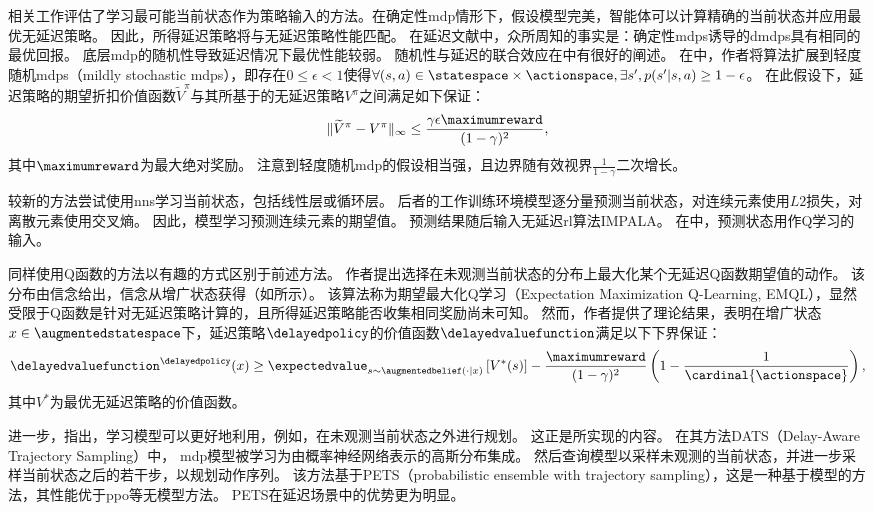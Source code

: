 相关工作评估了学习最可能当前状态\cite{walsh2009learning}作为策略输入的方法。在确定性\gls{mdp}情形下，假设模型完美，智能体可以计算精确的当前状态并应用最优无延迟策略。
因此，所得延迟策略将与无延迟策略性能匹配。
在延迟文献中，众所周知的事实是：确定性\glspl{mdp}诱导的\glspl{dmdp}具有相同的最优回报。
底层\gls{mdp}的随机性导致延迟情况下最优性能较弱。
随机性与延迟的联合效应在\cite[Remark 3.1]{derman2021acting}中有很好的阐述。
在\cite{walsh2009learning}中，作者将算法扩展到轻度随机\glspl{mdp}（mildly stochastic \glspl{mdp}），即存在$0\le\epsilon<1$使得$\forall (s,a)\in\statespace\times\actionspace, \exists s', p(s'\vert s,a)\geq 1-\epsilon$。
在此假设下，延迟策略的期望折扣价值函数$\widetilde{V}^{\pi}$与其所基于的无延迟策略$V^{\pi}$之间满足如下保证：
\begin{align*}
    \lVert \widetilde{V}^{\pi}-V^{\pi}\rVert_{\infty}\leq \frac{\gamma\epsilon \maximumreward}{(1-\gamma)^2},
\end{align*}
其中$\maximumreward$为最大绝对奖励。
注意到轻度随机\gls{mdp}的假设相当强，且边界随有效视界$\textstyle\frac{1}{1-\gamma}$二次增长。

较新的方法尝试使用\glspl{nn}学习当前状态，包括线性层\cite{derman2021acting}或循环层\cite{firoiu2018human}。
后者的工作训练环境模型逐分量预测当前状态，对连续元素使用$L2$损失，对离散元素使用交叉熵。
因此，模型学习预测连续元素的期望值。
预测结果随后输入无延迟\gls{rl}算法IMPALA\cite{espeholt2018impala}。
在\cite{derman2021acting}中，预测状态用作Q学习\cite{watkins1989learning}的输入。

同样使用Q函数的\cite{agarwal2021blind}方法以有趣的方式区别于前述方法。
作者提出选择在未观测当前状态的分布上最大化某个无延迟Q函数期望值的动作。
该分布由信念给出，信念从增广状态获得（如所示）。
该算法称为期望最大化Q学习（Expectation Maximization Q-Learning, EMQL），显然受限于Q函数是针对无延迟策略计算的，且所得延迟策略能否收集相同奖励尚未可知。
然而，作者提供了理论结果，表明在增广状态$x\in\augmentedstatespace$下，延迟策略$\delayedpolicy$的价值函数$\delayedvaluefunction$满足以下下界保证：
\begin{align*}
    \delayedvaluefunction^\delayedpolicy(x) \ge \expectedvalue_{s\sim \augmentedbelief(\cdot\vert x)}\left[V^{*}(s)\right] - \frac{\maximumreward}{(1-\gamma)^2}\left(1-\frac{1}{\cardinal{\actionspace}}\right),
\end{align*}
其中$V^{*}$为最优无延迟策略的价值函数。

进一步，\cite{firoiu2018human}指出，学习模型可以更好地利用，例如，在未观测当前状态之外进行规划。
这正是\cite{chen2021delay}所实现的内容。
在其方法DATS（Delay-Aware Trajectory Sampling）中，
\gls{mdp}模型被学习为由概率神经网络表示的高斯分布集成。
然后查询模型以采样未观测的当前状态，并进一步采样当前状态之后的若干步，以规划动作序列。
该方法基于PETS（probabilistic ensemble with trajectory sampling）\cite{chua2018deep}，这是一种基于模型的方法，其性能优于\gls{ppo}等无模型方法。
PETS在延迟场景中的优势更为明显。

